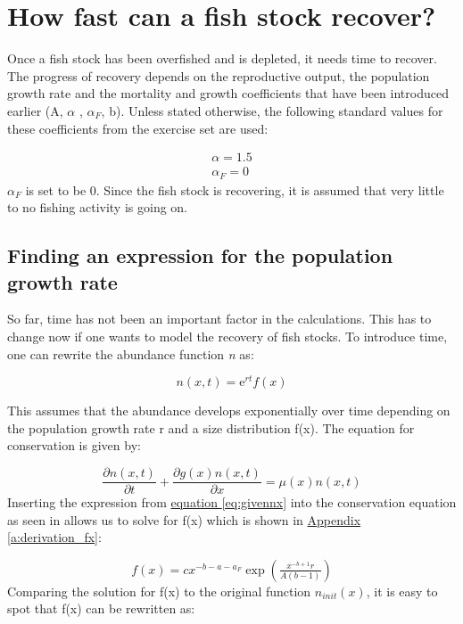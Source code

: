 \documentclass{article}
\numberwithin{equation}{section} %
\newcommand{\me}{\mathrm{e}}
\begin{document}
\section{How fast can a fish stock recover?}\label{sec:Ex4}
Once a fish stock has been overfished and is depleted, it needs time to recover. The progress of recovery depends on the reproductive output, the population growth rate and the mortality and growth coefficients that have been introduced earlier (A, $\alpha$ , $\alpha_F$,  b). Unless stated otherwise, the following standard values for these coefficients from the exercise set are used:

\begin{align}
    \alpha = 1.5\\
    \alpha_F = 0
\end{align}
 $\alpha_F$ is set to be 0. Since the fish stock is recovering, it is assumed that very little to no fishing activity is going on.

\subsection{Finding an expression for the population growth rate}\label{sec:Ex4A}
So far, time has not been an important factor in the calculations. This has to change now if one wants to model the recovery of fish stocks. To introduce time, one can rewrite the abundance function \textit{n} as:

\begin{equation}\label{eq:givennx}
	n(x,t)=\me^{rt}f(x)
\end{equation}

This assumes that the abundance develops exponentially over time depending on the population growth rate r and a size distribution f(x). The equation for conservation is given by:

\begin{equation}\label{eq:conservationPartial}
	\dfrac{\partial n(x,t)}{\partial t} + \dfrac{\partial g(x)n(x,t)}{\partial x} = \mu(x)n(x,t)
\end{equation}
Inserting the expression from \hyperref[eq:givennx]{equation \ref{eq:givennx}} into the conservation equation as seen in allows us to solve for f(x) which is shown in \hyperref[a:derivation_fx]{Appendix \ref{a:derivation_fx}}\label{jmp:a:derivation_fx}:

\begin{equation}\label{eq:fxcalculated}
	f(x) = cx^{-b-a-a_F}\exp\left(\tfrac{x^{-b+1}r}{A(b-1)}\right)
\end{equation}
Comparing the solution for f(x) to the original function $n_{init}(x)$, it is easy to spot that f(x) can be rewritten as: 
\end{document}
